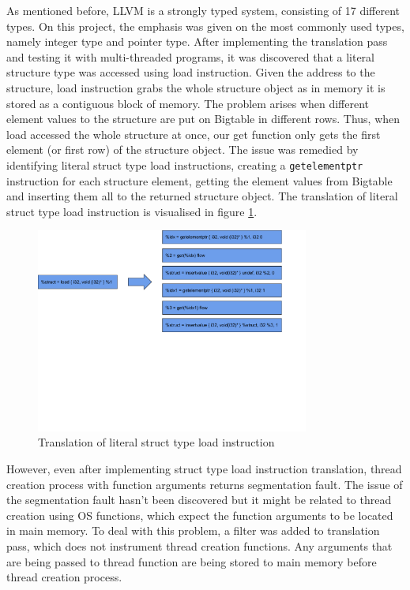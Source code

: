 \documentclass[bsc,frontabs,twoside,singlespacing,parskip,deptreport]{infthesis}     %
\begin{document}
As mentioned before, LLVM is a strongly typed system, consisting of 17 different types. On this project, the emphasis was given on the most commonly used types, namely integer type and pointer type. After implementing the translation pass and testing it with multi-threaded programs, it was discovered that a literal structure type was accessed using load instruction. Given the address to the structure, load instruction grabs the whole structure object as in memory it is stored as a contiguous block of memory. The problem arises when different element values to the structure are put on Bigtable in different rows. Thus, when load accessed the whole structure at once, our get function only gets the first element (or first row) of the structure object. The issue was remedied by identifying literal struct type load instructions, creating a \texttt{getelementptr} instruction for each structure element, getting the element values from Bigtable and inserting them all to the returned structure object. The translation of literal struct type load instruction is visualised in figure \ref{fig:struct_type}.

\begin{figure}[H]
\centering
\includegraphics[width=0.8\textwidth]{images/struct_type}
\caption{Translation of literal struct type load instruction}
\label{fig:struct_type}
\end{figure}

However, even after implementing struct type load instruction translation, thread creation process with function arguments returns segmentation fault. The issue of the segmentation fault hasn't been discovered but it might be related to thread creation using OS functions, which expect the function arguments to be located in main memory. To deal with this problem, a filter was added to translation pass, which does not instrument thread creation functions. Any arguments that are being passed to thread function are being stored to main memory before thread creation process.
\end{document}

